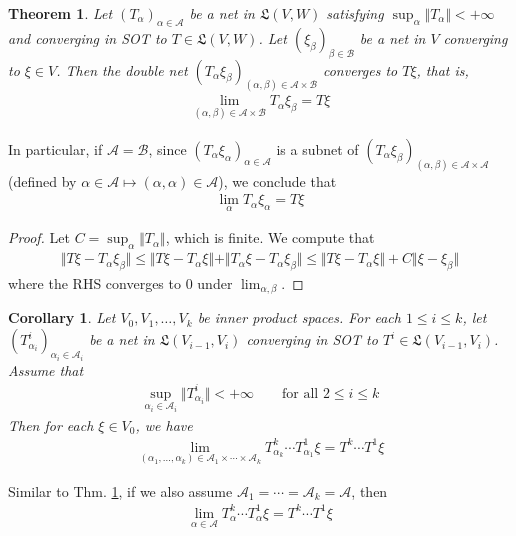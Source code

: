 \documentclass[12pt,b5paper,notitlepage]{article}
\theoremstyle{definition}
\theoremstyle{plain}
\newtheorem{thm}[df]{Theorem}
\newtheorem{co}[df]{Corollary}
\newcommand{\fk}{\mathfrak}
\newcommand{\scr}{\mathscr}
\numberwithin{equation}{section}
\begin{document}
\begin{thm}\label{lb155}
Let $(T_\alpha)_{\alpha\in\scr A}$ be a net in $\fk L(V,W)$ satisfying $\sup_\alpha\Vert T_\alpha\Vert<+\infty$ and converging in SOT to $T\in\fk L(V,W)$. Let $(\xi_\beta)_{\beta\in\scr B}$ be a net in $V$ converging to $\xi\in V$. Then the double net $(T_\alpha\xi_\beta)_{(\alpha,\beta)\in\scr A\times\scr B}$ converges to $T\xi$, that is,
\begin{align*}
\lim_{(\alpha,\beta)\in\scr A\times\scr B}T_\alpha\xi_\beta=T\xi
\end{align*}
\end{thm}

In particular, if $\scr A=\scr B$, since $(T_\alpha\xi_\alpha)_{\alpha\in\scr A}$ is a subnet of $(T_\alpha\xi_\beta)_{(\alpha,\beta)\in\scr A\times\scr A}$ (defined by $\alpha\in\scr A\mapsto(\alpha,\alpha)\in\scr A$), we conclude that
\begin{align*}
\lim_\alpha T_\alpha\xi_\alpha=T\xi
\end{align*}

\begin{proof}
Let $C=\sup_\alpha\Vert T_\alpha\Vert$, which is finite. We compute that
\begin{align*}
\Vert T\xi-T_\alpha\xi_\beta\Vert\leq\Vert T\xi-T_\alpha\xi\Vert+\Vert T_\alpha\xi-T_\alpha\xi_\beta\Vert\leq \Vert T\xi-T_\alpha\xi\Vert+C\Vert\xi-\xi_\beta\Vert
\end{align*}
where the RHS converges to $0$ under $\lim_{\alpha,\beta}$.
\end{proof}


\begin{co}\label{lb159}
Let $V_0,V_1,\dots,V_k$ be inner product spaces. For each $1\leq i\leq k$, let $(T^i_{\alpha_i})_{\alpha_i\in\scr A_i}$ be a net in $\fk L(V_{i-1},V_i)$ converging in SOT to $T^i\in\fk L(V_{i-1},V_i)$. Assume that
\begin{align*}
\sup_{\alpha_i\in\scr A_i}\Vert T^i_{\alpha_i}\Vert<+\infty\qquad\text{for all }2\leq i\leq k
\end{align*}
Then for each $\xi\in V_0$, we have
\begin{align*}
\lim_{(\alpha_1,\dots,\alpha_k)\in\scr A_1\times\cdots\times\scr A_k}T^k_{\alpha_k}\cdots T^1_{\alpha_1}\xi= T^k\cdots T^1\xi
\end{align*}
\end{co}

Similar to Thm. \ref{lb155}, if we also assume $\scr A_1=\cdots=\scr A_k=\scr A$, then
\begin{align*}
\lim_{\alpha\in\scr A} T^k_\alpha\cdots T^1_\alpha\xi=T^k\cdots T^1\xi
\end{align*}
\end{document}
